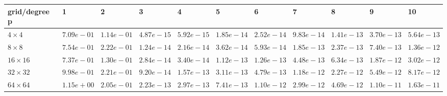 \begin{tabular}{lllllllllll}
\hline
 grid/degree p   & 1          & 2          & 3          & 4          & 5          & 6          & 7          & 8          & 9          & 10         \\
\hline
 $4 \times 4$    & $7.09e-01$ & $1.14e-01$ & $4.87e-15$ & $5.92e-15$ & $1.85e-14$ & $2.52e-14$ & $9.83e-14$ & $1.41e-13$ & $3.70e-13$ & $5.64e-13$ \\
 $8 \times 8$    & $7.54e-01$ & $2.22e-01$ & $1.24e-14$ & $2.16e-14$ & $3.62e-14$ & $5.93e-14$ & $1.85e-13$ & $2.37e-13$ & $7.40e-13$ & $1.36e-12$ \\
 $16 \times 16$  & $7.37e-01$ & $1.30e-01$ & $2.84e-14$ & $3.40e-14$ & $1.12e-13$ & $1.26e-13$ & $4.48e-13$ & $6.34e-13$ & $1.87e-12$ & $3.02e-12$ \\
 $32 \times 32$  & $9.98e-01$ & $2.21e-01$ & $9.20e-14$ & $1.57e-13$ & $3.11e-13$ & $4.79e-13$ & $1.18e-12$ & $2.27e-12$ & $5.49e-12$ & $8.17e-12$ \\
 $64 \times 64$  & $1.15e+00$ & $2.05e-01$ & $2.23e-13$ & $2.97e-13$ & $7.41e-13$ & $1.10e-12$ & $2.99e-12$ & $4.69e-12$ & $1.10e-11$ & $1.63e-11$ \\
\hline
\end{tabular}